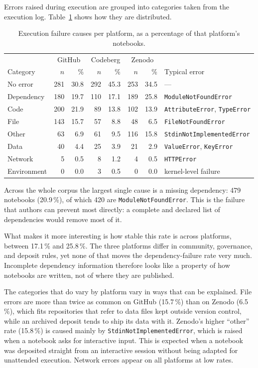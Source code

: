 Errors raised during execution are grouped into categories taken from the execution log. Table~\ref{tab:error-causes} shows how they are distributed.

\begin{table}[htbp]
\centering
\caption{Execution failure causes per platform, as a percentage of that platform's notebooks.}
\label{tab:error-causes}
\small
\begin{tabularx}{\textwidth}{@{}>{\raggedright\arraybackslash}p{2.3cm} r r r r r r X@{}}
\toprule
& \multicolumn{2}{c}{GitHub} & \multicolumn{2}{c}{Codeberg} & \multicolumn{2}{c}{Zenodo} & \tabularnewline
\cmidrule(lr){2-3}\cmidrule(lr){4-5}\cmidrule(lr){6-7}
Category & $n$ & \% & $n$ & \% & $n$ & \% & Typical error\tabularnewline
\midrule
No error & 281 & 30.8 & 292 & 45.3 & 253 & 34.5 & ---\tabularnewline
Dependency & 180 & 19.7 & 110 & 17.1 & 189 & 25.8 & \texttt{ModuleNotFoundError}\tabularnewline
Code & 200 & 21.9 & 89 & 13.8 & 102 & 13.9 & \texttt{AttributeError}, \texttt{TypeError}\tabularnewline
File & 143 & 15.7 & 57 & 8.8 & 48 & 6.5 & \texttt{FileNotFoundError}\tabularnewline
Other & 63 & 6.9 & 61 & 9.5 & 116 & 15.8 & \texttt{StdinNotImplementedError}\tabularnewline
Data & 40 & 4.4 & 25 & 3.9 & 21 & 2.9 & \texttt{ValueError}, \texttt{KeyError}\tabularnewline
Network & 5 & 0.5 & 8 & 1.2 & 4 & 0.5 & \texttt{HTTPError}\tabularnewline
Environment & 0 & 0.0 & 3 & 0.5 & 0 & 0.0 & kernel-level failure\tabularnewline
\bottomrule
\end{tabularx}
\end{table}

Across the whole corpus the largest single cause is a missing dependency: 479 notebooks (20.9\,\%), of which 420 are \texttt{ModuleNotFoundError}. This is the failure that authors can prevent most directly: a complete and declared list of dependencies would remove most of it.

What makes it more interesting is how stable this rate is across platforms, between 17.1\,\% and 25.8\,\%. The three platforms differ in community, governance, and deposit rules, yet none of that moves the dependency-failure rate very much. Incomplete dependency information therefore looks like a property of how notebooks are written, not of where they are published.

The categories that do vary by platform vary in ways that can be explained. File errors are more than twice as common on GitHub (15.7\,\%) than on Zenodo (6.5\,\%), which fits repositories that refer to data files kept outside version control, while an archived deposit tends to ship its data with it. Zenodo's higher ``other'' rate (15.8\,\%) is caused mainly by \texttt{StdinNotImplementedError}, which is raised when a notebook asks for interactive input. This is expected when a notebook was deposited straight from an interactive session without being adapted for unattended execution. Network errors appear on all platforms at low rates.

